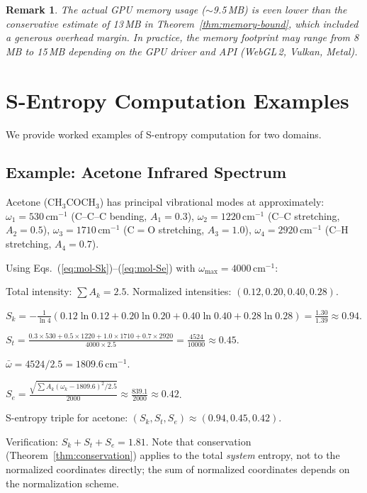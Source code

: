 \documentclass[11pt,twocolumn,a4paper]{article}
\newtheorem{remark}[theorem]{Remark}
\newcommand{\Sk}{S_k}
\newcommand{\St}{S_t}
\newcommand{\Se}{S_e}
\begin{document}
\begin{remark}
The actual GPU memory usage ($\sim$9.5\,MB) is even lower than the
conservative estimate of 13\,MB in Theorem~\ref{thm:memory-bound},
which included a generous overhead margin. In practice, the memory
footprint may range from 8\,MB to 15\,MB depending on the GPU driver
and API (WebGL\,2, Vulkan, Metal).
\end{remark}


\section{S-Entropy Computation Examples}
\label{app:sentropy}

We provide worked examples of S-entropy computation for two domains.

\subsection{Example: Acetone Infrared Spectrum}

Acetone ($\text{CH}_3\text{COCH}_3$) has principal vibrational
modes at approximately:
$\omega_1 = 530\,\text{cm}^{-1}$ (C--C--C bending, $A_1 = 0.3$),
$\omega_2 = 1220\,\text{cm}^{-1}$ (C--C stretching, $A_2 = 0.5$),
$\omega_3 = 1710\,\text{cm}^{-1}$ (C$=$O stretching, $A_3 = 1.0$),
$\omega_4 = 2920\,\text{cm}^{-1}$ (C--H stretching, $A_4 = 0.7$).

Using Eqs.~(\ref{eq:mol-Sk})--(\ref{eq:mol-Se}) with
$\omega_{\max} = 4000\,\text{cm}^{-1}$:

Total intensity: $\sum A_k = 2.5$.
Normalized intensities: $(0.12, 0.20, 0.40, 0.28)$.

$\Sk = -\frac{1}{\ln 4}(0.12 \ln 0.12 + 0.20 \ln 0.20
+ 0.40 \ln 0.40 + 0.28 \ln 0.28) = \frac{1.30}{1.39} \approx 0.94$.

$\St = \frac{0.3 \times 530 + 0.5 \times 1220 + 1.0 \times 1710
+ 0.7 \times 2920}{4000 \times 2.5} = \frac{4524}{10000} \approx 0.45$.

$\bar{\omega} = 4524/2.5 = 1809.6\,\text{cm}^{-1}$.

$\Se = \frac{\sqrt{\sum A_k(\omega_k - 1809.6)^2 / 2.5}}{2000}
\approx \frac{839.1}{2000} \approx 0.42$.

S-entropy triple for acetone: $(\Sk, \St, \Se) \approx (0.94, 0.45, 0.42)$.

Verification: $\Sk + \St + \Se = 1.81$. Note that conservation
(Theorem~\ref{thm:conservation}) applies to the total
\emph{system} entropy, not to the normalized coordinates directly;
the sum of normalized coordinates depends on the normalization
scheme.
\end{document}
